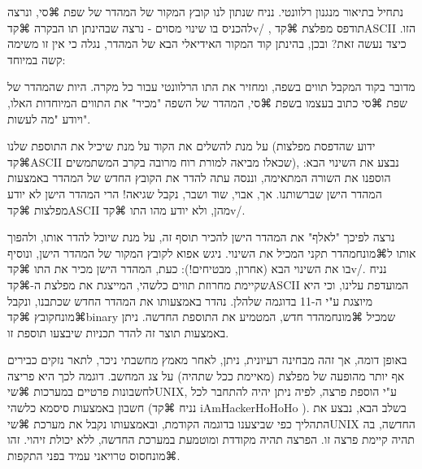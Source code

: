 נתחיל בתיאור מנגנון רלוונטי. נניח שנתון לנו קובץ המקור של המהדר של שפת ⌘סי, ונרצה להכניס בו שינוי מסוים - נרצה שבהינתן תו הבקרה ⌘קד{v/} , תודפס מפלצת ⌘קד{ASCII} הזו. כיצד נעשה זאת? ובכן, בהינתן קוד המקור האידיאלי הבא של המהדר, נגלה כי אין זו משימה קשה במיוחד:

מדובר בקוד המקבל תווים בשפה, ומחזיר את התו הרלוונטי עבור כל מקרה. היות שהמהדר של שפת ⌘סי כתוב בעצמו בשפת ⌘סי, המהדר של השפה "מכיר" את התווים המיוחדות האלו, ויודע "מה לעשות". 

על מנת להשלים את הקוד על מנת שיכיל את התוספת שלנו (ידוע שהדפסת מפלצות ⌘קד{ASCII} שכאלו מביאה למורת רוח מרובה בקרב המשתמשים), נבצע את השינוי הבא: 
הוספנו את השורה המתאימה, וננסה עתה להדר את הקובץ החדש של המהדר באמצעות המהדר הישן שברשותנו. אך, אבוי, שוד ושבר, נקבל שגיאה! הרי המהדר הישן לא יודע מפלצות ⌘קד{ASCII} מהן, ולא יודע מהו התו ⌘קד{v/}. 

נרצה לפיכך "לאלף" את המהדר הישן להכיר תוסף זה, על מנת שיוכל להדר אותו, ולהפוך אותו ל⌘מונח{מהדר} תקני המכיל את השינוי. ניגש אפוא לקובץ המקור של המהדר הישן, ונוסיף בו את השינוי הבא (אחרון, מבטיחים!):
כעת, המהדר הישן מכיר את התו ⌘קד{v/}. נניח שקיימת מחרוזת תווים כלשהי, המייצגת את מפלצת ה-⌘קד{ASCII} המועדפת עלינו, וכי היא מיוצגת ע"י ה-11 בדוגמה שלהלן. נהדר באמצעותו את המהדר החדש שכתבנו, ונקבל ⌘מונח{קובץ} ⌘קד{binary} שמכיל ⌘מונח{מהדר} חדש, המטמיע את התוספת החדשה. ניתן באמצעות תוצר זה להדר תכניות שיבצעו תוספת זו.

באופן דומה, אך זהה מבחינה רעיונית, ניתן, לאחר מאמץ מחשבתי ניכר, לתאר נזקים כבירים אף יותר מהופעה של מפלצת (מאיימת ככל שתהיה) על צג המחשב. דוגמה לכך היא פריצה לחשבונות פרטיים במערכות ⌘שי{UNIX}, ע"י הוספת פרצה, לפיה ניתן יהיה להתחבר לכל חשבון באמצעות סיסמא כלשהי (נניח ⌘קד{ iAmHackerHoHoHo }). בשלב הבא, נבצע את התהליך כפי שביצענו בדוגמה הקודמת, ובאמצעותו נקבל את מערכת ⌘שי{UNIX} החדשה, בה תהיה קיימת פרצה זו. הפרצה תהיה מקודדת ומוטמעת במערכת החדשה, ללא יכולת זיהוי. זהו ⌘מונח{סוס טרויאני} עמיד בפני התקפות.






